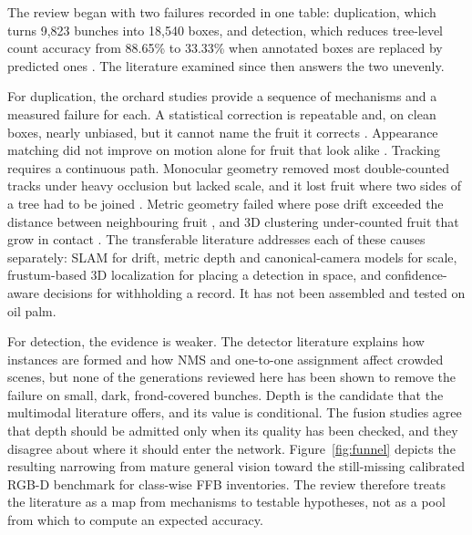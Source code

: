 The review began with two failures recorded in one table: duplication, which turns 9{,}823 bunches into 18{,}540 boxes, and detection, which reduces tree-level count accuracy from 88.65\% to 33.33\% when annotated boxes are replaced by predicted ones \cite{indriani2026sawitmvc}. The literature examined since then answers the two unevenly.

For duplication, the orchard studies provide a sequence of mechanisms and a measured failure for each. A statistical correction is repeatable and, on clean boxes, nearly unbiased, but it cannot name the fruit it corrects \cite{ledger_r_408d13511cac4177,indriani2026sawitmvc}. Appearance matching did not improve on motion alone for fruit that look alike \cite{ledger_r_ee550a3e3a6fb318,ledger_r_2d972b94554c6cd1}. Tracking requires a continuous path. Monocular geometry removed most double-counted tracks under heavy occlusion but lacked scale, and it lost fruit where two sides of a tree had to be joined \cite{ledger_m_9966d81433d61ed3,ledger_r_00f82e0f404d691b}. Metric geometry failed where pose drift exceeded the distance between neighbouring fruit \cite{ledger_r_d4270ea8ab11f268}, and 3D clustering under-counted fruit that grow in contact \cite{ledger_m_1210e3ea00486b68}. The transferable literature addresses each of these causes separately: SLAM for drift, metric depth and canonical-camera models for scale, frustum-based 3D localization for placing a detection in space, and confidence-aware decisions for withholding a record. It has not been assembled and tested on oil palm.

For detection, the evidence is weaker. The detector literature explains how instances are formed and how NMS and one-to-one assignment affect crowded scenes, but none of the generations reviewed here has been shown to remove the failure on small, dark, frond-covered bunches. Depth is the candidate that the multimodal literature offers, and its value is conditional. The fusion studies agree that depth should be admitted only when its quality has been checked, and they disagree about where it should enter the network. Figure~\ref{fig:funnel} depicts the resulting narrowing from mature general vision toward the still-missing calibrated RGB-D benchmark for class-wise FFB inventories. The review therefore treats the literature as a map from mechanisms to testable hypotheses, not as a pool from which to compute an expected accuracy.

